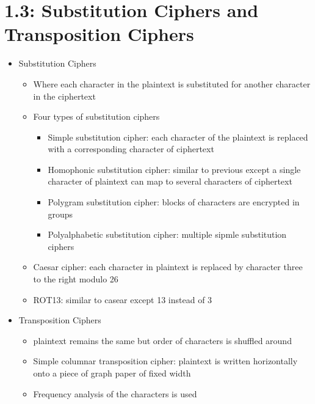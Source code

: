 \documentclass[]{article}
\begin{document}
\section{1.3: Substitution Ciphers and Transposition Ciphers}
\begin{itemize}
    \item Substitution Ciphers
    \begin{itemize}
        \item Where each character in the plaintext is substituted for another character in the ciphertext
        \item Four types of substitution ciphers
        \begin{itemize}
            \item Simple substitution cipher: each character of the plaintext is replaced with a corresponding character of ciphertext
            \item Homophonic substitution cipher: similar to previous except a single character of plaintext can map to several characters of ciphertext
            \item Polygram substitution cipher: blocks of characters are encrypted in groups
            \item Polyalphabetic substitution cipher: multiple sipmle substitution ciphers
        \end{itemize}
        \item Caesar cipher: each character in plaintext is replaced by character three to the right modulo 26
        \item ROT13: similar to casear except 13 instead of 3
    \end{itemize}
    \item Transposition Ciphers
    \begin{itemize}
        \item plaintext remains the same but order of characters is shuffled around
        \item Simple columnar transposition cipher: plaintext is written horizontally onto a piece of graph paper of fixed width 
        \item Frequency analysis of the characters is used
    \end{itemize}
\end{itemize}
\end{document}

